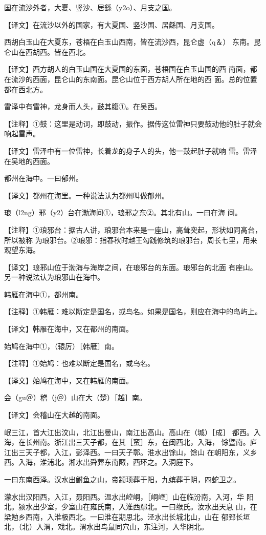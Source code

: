 \documentclass[a4paper,12pt,UTF8,twoside]{ctexbook}
\begin{document}
国在流沙外者，大夏、竖沙、居繇（y2o）、月支之国。

【译文】在流沙以外的国家，有大夏国、竖沙国、居繇国、月支国。

西胡白玉山在大夏东，苍梧在白玉山西南，皆在流沙西，昆仑虚（q＆） 东南。昆仑山在西胡西。皆在西北。

【译文】西方胡人的白玉山国在大夏国的东面，苍梧国在白玉山国的西 南面，都在流沙的西面，昆仑山的东南面。昆仑山位于西方胡人所在地的西 面。总的位置都在西北方。

雷泽中有雷神，龙身而人头，鼓其腹①。在吴西。

【注释】①鼓：这里是动词，即鼓动，振作。据传这位雷神只要鼓动他的肚子就会响起雷声。

【译文】雷泽中有一位雷神，长着龙的身子人的头，他一鼓起肚子就响 雷。雷泽在吴地的西面。

都州在海中。一曰郁州。

【译文】都州在海里。一种说法认为都州叫做郁州。

琅（l2ng）邪（y2）台在渤海间①，琅邪之东②。其北有山。一曰在海 间。

【注释】①琅邪台：据古人讲，琅邪台本来是一座山，高耸突起，形状如同高台，所以被称 为琅邪台。②琅邪：指春秋时越王勾践修筑的琅邪台，周长七里，用来观望东海。

【译文】琅邪山位于渤海与海岸之间，在琅邪台的东面。琅邪台的北面 有座山。另一种说法认为琅邪山在海中。

韩雁在海中①，都州南。

【注释】①韩雁：难以断定是国名，或鸟名。如果是国名，则应在海中的岛屿上。

【译文】韩雁在海中，又在都州的南面。

始鸠在海中①，（辕厉）［韩雁］南。

【注释】①始鸠：也难以断定是国名，或鸟名。

【译文】始鸠在海中，又在韩雁的南面。

会（gu＠）稽（j＠）山在大（楚）［越］南。

【译文】会稽山在大越的南面。

岷三江，首大江出汶山，北江出曼山，南江出高山。高山在（城）［成］ 都西。入海，在长州南。浙江出三天子都，在其［蛮］东，在闽西北，入海， 馀暨南。庐江出三天子都，入江，彭泽西。一曰天子鄣。淮水出馀山，馀山 在朝阳东，义乡西。入海，淮浦北。湘水出舜葬东南陬，西环之。入洞庭下。

一曰东南西泽。汉水出鲋鱼之山，帝颛顼葬于阳，九嫔葬于阴，四蛇卫之。

濛水出汉阳西，入江，聂阳西。温水出崆峒，［峒崆］山在临汾南，入河，华 阳北。颍水出少室，少室山在雍氏南，入淮西鄢北。一曰缑氏。汝水出天息 山，在梁勉乡西南，入淮极西北。一曰淮在期思北。泾水出长城北山，山在 郁郅长垣北，（北）入渭，戏北。渭水出鸟鼠同穴山，东注河，入华阴北。
\end{document}
